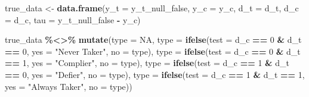 \documentclass[12pt,leqno]{article}
\newenvironment{Shaded}{\begin{snugshade}}{\end{snugshade}}
\newcommand{\DataTypeTok}[1]{\textcolor[rgb]{0.13,0.29,0.53}{#1}}
\newcommand{\DecValTok}[1]{\textcolor[rgb]{0.00,0.00,0.81}{#1}}
\newcommand{\KeywordTok}[1]{\textcolor[rgb]{0.13,0.29,0.53}{\textbf{#1}}}
\newcommand{\NormalTok}[1]{#1}
\newcommand{\OperatorTok}[1]{\textcolor[rgb]{0.81,0.36,0.00}{\textbf{#1}}}
\newcommand{\OtherTok}[1]{\textcolor[rgb]{0.56,0.35,0.01}{#1}}
\newcommand{\StringTok}[1]{\textcolor[rgb]{0.31,0.60,0.02}{#1}}
\theoremstyle{newstyle}
\begin{document}
\begin{Shaded}
\begin{Highlighting}[]
\NormalTok{true\_data \textless{}{-}}\StringTok{ }\KeywordTok{data.frame}\NormalTok{(}\DataTypeTok{y\_t =}\NormalTok{ y\_t\_null\_false,}
                        \DataTypeTok{y\_c =}\NormalTok{ y\_c,}
                        \DataTypeTok{d\_t =}\NormalTok{ d\_t,}
                        \DataTypeTok{d\_c =}\NormalTok{ d\_c,}
                        \DataTypeTok{tau =}\NormalTok{ y\_t\_null\_false }\OperatorTok{{-}}\StringTok{ }\NormalTok{y\_c)}

\NormalTok{true\_data }\OperatorTok{\%\textless{}\textgreater{}\%}\StringTok{ }\KeywordTok{mutate}\NormalTok{(}\DataTypeTok{type =} \OtherTok{NA}\NormalTok{,}
                      \DataTypeTok{type =} \KeywordTok{ifelse}\NormalTok{(}\DataTypeTok{test =}\NormalTok{ d\_c }\OperatorTok{==}\StringTok{ }\DecValTok{0} \OperatorTok{\&}\StringTok{ }\NormalTok{d\_t }\OperatorTok{==}\StringTok{ }\DecValTok{0}\NormalTok{,}
                                    \DataTypeTok{yes =} \StringTok{"Never Taker"}\NormalTok{,}
                                    \DataTypeTok{no =}\NormalTok{ type),}
                      \DataTypeTok{type =} \KeywordTok{ifelse}\NormalTok{(}\DataTypeTok{test =}\NormalTok{ d\_c }\OperatorTok{==}\StringTok{ }\DecValTok{0} \OperatorTok{\&}\StringTok{ }\NormalTok{d\_t }\OperatorTok{==}\StringTok{ }\DecValTok{1}\NormalTok{,}
                                    \DataTypeTok{yes =} \StringTok{"Complier"}\NormalTok{,}
                                    \DataTypeTok{no =}\NormalTok{ type),}
                      \DataTypeTok{type =} \KeywordTok{ifelse}\NormalTok{(}\DataTypeTok{test =}\NormalTok{ d\_c }\OperatorTok{==}\StringTok{ }\DecValTok{1} \OperatorTok{\&}\StringTok{ }\NormalTok{d\_t }\OperatorTok{==}\StringTok{ }\DecValTok{0}\NormalTok{,}
                                    \DataTypeTok{yes =} \StringTok{"Defier"}\NormalTok{,}
                                    \DataTypeTok{no =}\NormalTok{ type),}
                      \DataTypeTok{type =} \KeywordTok{ifelse}\NormalTok{(}\DataTypeTok{test =}\NormalTok{ d\_c }\OperatorTok{==}\StringTok{ }\DecValTok{1} \OperatorTok{\&}\StringTok{ }\NormalTok{d\_t }\OperatorTok{==}\StringTok{ }\DecValTok{1}\NormalTok{,}
                                    \DataTypeTok{yes =} \StringTok{"Always Taker"}\NormalTok{,}
                                    \DataTypeTok{no =}\NormalTok{ type))}
\end{Highlighting}
\end{Shaded}
\end{document}
